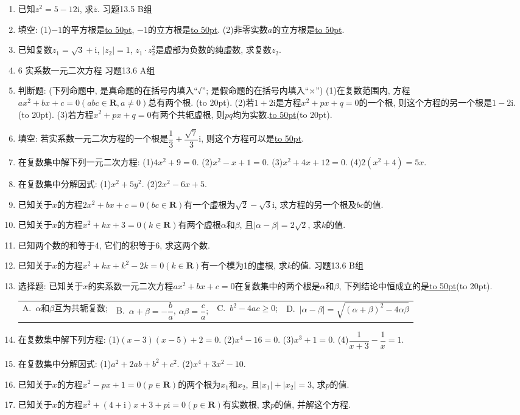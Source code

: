 \documentclass[10pt,a4paper]{article}
\newcommand{\blank}[1]{\underline{\hbox to #1pt{}}}
\newcommand{\bracket}[1]{(\hbox to #1pt{})}
\newcommand{\fourch}[4]{\par\begin{tabular}{p{.23\textwidth}p{.23\textwidth}p{.23\textwidth}p{.23\textwidth}}
A.~#1 &B.~#2& C.~#3& D.~#4
\end{tabular}}
\begin{document}
\begin{enumerate}[1.]
\item 已知$z^2=5-12\mathrm{i}$, 求$\overline z$.
习题13.5  B组
\item 填空:
(1)$-1$的平方根是\blank{50}, $-1$的立方根是\blank{50}.
(2)非零实数$a$的立方根是\blank{50}.
\item 已知复数$z_1=\sqrt 3+\mathrm{i}$, $|z_2|=1$, $z_1\cdot z_2^2$是虚部为负数的纯虚数, 求复数$z_2$.
\item 6  实系数一元二次方程
习题13.6  A组
\item 判断题: (下列命题中, 是真命题的在括号内填入``√''; 是假命题的在括号内填入``×'')
(1)在复数范围内, 方程$ax^2+bx+c=0(abc\in \mathbf{R},a\ne 0)$总有两个根.  \bracket{20}.
(2)若$1+2\mathrm{i}$是方程$x^2+px+q=0$的一个根, 则这个方程的另一个根是$1-2\mathrm{i}$.  \bracket{20}.
(3)若方程$x^2+px+q=0$有两个共轭虚根, 则$pq$均为实数.\blank{50}\bracket{20}.
\item 填空:
若实系数一元二次方程的一个根是$\dfrac 13+\dfrac{\sqrt 7}3\mathrm{i}$, 则这个方程可以是\blank{50}.
\item 在复数集中解下列一元二次方程:
(1)$4x^2+9=0$.							(2)$x^2-x+1=0$.
(3)$x^2+4x+12=0$.					(4)$2(x^2+4)=5x$.
\item 在复数集中分解因式:
(1)$x^2+5y^2$.							(2)$2x^2-6x+5$.
\item 已知关于$x$的方程$2x^2+bx+c=0(bc\in \mathbf{R})$有一个虚根为$\sqrt 2-\sqrt 3\mathrm{i}$, 求方程的另一个根及$bc$的值.
\item 已知关于$x$的方程$x^2+kx+3=0(k\in \mathbf{R})$有两个虚根$\alpha$和$\beta$, 且$|\alpha -\beta|=2\sqrt 2$, 求$k$的值.
\item 已知两个数的和等于4, 它们的积等于6, 求这两个数.
\item 已知关于$x$的方程$x^2+kx+k^2-2k=0(k\in \mathbf{R})$有一个模为1的虚根, 求$k$的值.
习题13.6  B组
\item 选择题:
已知关于$x$的实系数一元二次方程$ax^2+bx+c=0$在复数集中的两个根是$\alpha$和$\beta$, 下列结论中恒成立的是\blank{50}\bracket{20}.
\fourch{$\alpha$和$\beta$互为共轭复数;}{$\alpha +\beta =-\dfrac ba$, $\alpha \beta =\dfrac ca$;}{$b^2-4ac\ge 0$;}{$|\alpha -\beta|=\sqrt {(\alpha +\beta)^2-4\alpha \beta }$}
\item 在复数集中解下列方程:
(1)$(x-3)(x-5)+2=0$.				(2)$x^4-16=0$.
(3)$x^3+1=0$.							(4)$\dfrac 1{x+3}-\dfrac 1x=1$.
\item 在复数集中分解因式:
(1)$a^2+2ab+b^2+c^2$.					(2)$x^4+3x^2-10$.
\item 已知关于$x$的方程$x^2-px+1=0(p\in \mathbf{R})$的两个根为$x_1$和$x_2$, 且$|x_1|+|x_2|=3$, 求$p$的值.
\item 已知关于$x$的方程$x^2+(4+\mathrm{i})x+3+p\mathrm{i}=0(p\in \mathbf{R})$有实数根, 求$p$的值, 并解这个方程.

\end{enumerate}
\end{document}
